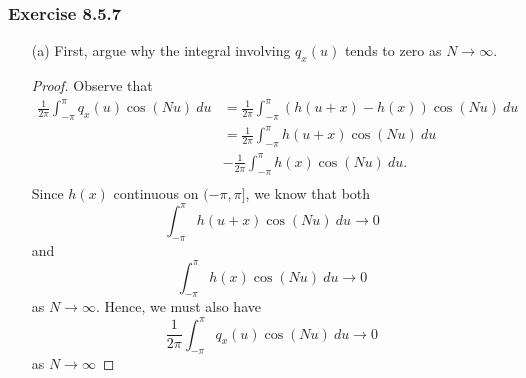 \subsubsection{Exercise 8.5.7}  
\begin{enumerate}
    \item[(a)] First, argue why the integral involving \( q_{x}(u)  \) tends to zero as \( N \to \infty  \).
        \begin{proof}
            Observe that 
            \begin{align*}
              \frac{ 1 }{ 2 \pi }   \int_{ -\pi }^{ \pi  } q_{x}(u) \cos(Nu)  \ du &= \frac{ 1 }{ 2 \pi } \int_{ -\pi }^{ \pi  }  (h(u+x) - h(x)) \cos(Nu) \ du \\
                                                                                   &= \frac{ 1 }{  2\pi  } \int_{ -\pi  }^{ \pi  }  h(u+x) \cos(Nu)  \ du  \\ 
                                                                                   &- \frac{ 1 }{ 2 \pi } \int_{ -\pi }^{ \pi  } h(x) \cos(Nu)   \ du. \\
            \end{align*}
            Since \( h(x)  \) continuous on \( (-\pi,\pi] \), we know that both 
            \[  \int_{ -\pi }^{ \pi } h(u+x) \cos(Nu)  \ du \to 0  \] and
            \[  \int_{ -\pi  }^{ \pi  } h(x) \cos(Nu)  \ du \to 0\] as \( N \to \infty  \).  
            Hence, we must also have 
            \[  \frac{ 1 }{ 2 \pi } \int_{ -\pi  }^{ \pi  } q_{x}(u) \cos(Nu)  \ du \to 0  \] as \( N \to \infty  \)
            

\end{proof}
\end{enumerate}
